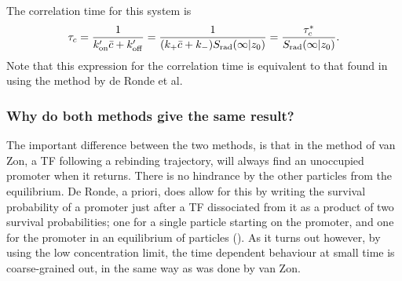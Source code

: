 The correlation time for this system is
\begin{equation}
 \tau_c = \frac{1}{k'_{\rm on} \bar{c} + k'_{\rm off}} = \frac{1}{ (k_+ \bar{c} + k_- ) S_{\rm rad}(\infty|z_0) } = \frac{\tau_c^*}{S_{\rm rad}(\infty|z_0)}.
\end{equation}
Note that this expression for the correlation time is equivalent to that found in  using the method by de Ronde et al. 

\subsubsection{Why do both methods give the same result?}
The important difference between the two methods, is that in the method of van Zon, a TF following a rebinding trajectory, will always find an unoccupied promoter when it returns. There is no hindrance by the other particles from the equilibrium. De Ronde, a priori, does allow for this by writing the survival probability of a promoter just after a TF dissociated from it as a product of two survival probabilities; one for a single particle starting on the promoter, and one for the promoter in an equilibrium of particles (). As it turns out however, by using the low concentration limit, the time dependent behaviour at small time is coarse-grained out, in the same way as was done by van Zon.

